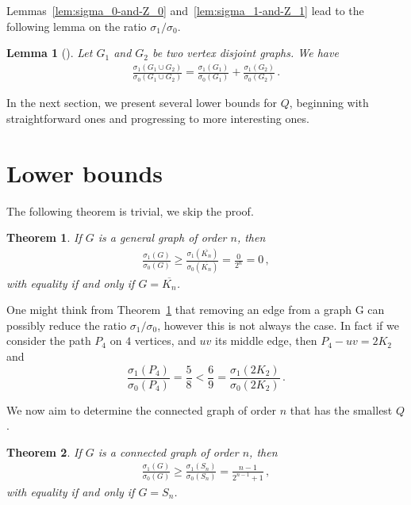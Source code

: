 \documentclass[a4paper,12pt]{amsart}
\newtheorem{thm}{Theorem}
\newtheorem{lem}{Lemma}
\begin{document}
\medskip
Lemmas~\ref{lem:sigma_0-and-Z_0} and~\ref{lem:sigma_1-and-Z_1} lead to the following lemma on the ratio $\sigma_1/\sigma_0$. 

\begin{lem}[\cite{DossouOloryAndriantiana2025}]
\label{Lem:AVSum}
Let $G_1$ and $G_2$ be two vertex disjoint graphs. We have
\begin{align*}
\frac{ \sigma_1(G_1 \cup G_2)}{ \sigma_0(G_1 \cup G_2)}=\frac{ \sigma_1(G_1)}{ \sigma_0(G_1)}+\frac{ \sigma_1(G_2)}{ \sigma_0(G_2)}\,.
\end{align*}
\end{lem}

\medskip
In the next section, we present several lower bounds for $Q$, beginning with straightforward ones and progressing to more interesting ones.

\section{Lower bounds}
\label{Sec:LOW}

The following theorem is trivial, we skip the proof.
\begin{thm}
    \label{thm:lower-bound-for-sigma-ratio-general-graphs}
    If $G$ is a general graph of order $n$, then 
    \begin{align*}
        \frac{\sigma_1(G)}{\sigma_0(G)} \ge \frac{\sigma_1(\overline{K_n})}{\sigma_0(\overline{K_n})} = \frac{0}{2^n} =0\,,
    \end{align*}
    with equality if and only if $G = \overline{K_n}$.
\end{thm}

\medskip
One might think from Theorem~\ref{thm:lower-bound-for-sigma-ratio-general-graphs} that removing an edge from a graph 
G can possibly reduce the ratio $\sigma_1/\sigma_0$, however this is not always the case. In fact if we consider the path $P_4$ on $4$ vertices, and $uv$ its middle edge, then $P_4-uv=2K_2$ and
$$
\frac{\sigma_1(P_4)}{\sigma_0(P_4)}
=\frac{5}{8}<\frac{6}{9}=\frac{\sigma_1(2K_2)}{\sigma_0(2K_2)}\,.
$$

\medskip
We now aim to determine the connected graph of order $n$ that has the smallest $Q$.%
\begin{thm}
    \label{thm:lower-bound-for-sigma-ratio-of-connected-graphs}
    If $G$ is a connected graph of order $n$, then 
    \begin{align*}
        \frac{\sigma_1(G)}{\sigma_0(G)} \ge \frac{\sigma_1(S_n)}{\sigma_0(S_n)} = \frac{n-1}{2^{n-1}+1}\,,
    \end{align*}
    with equality if and only if $G =S_n$.
\end{thm}
\end{document}
